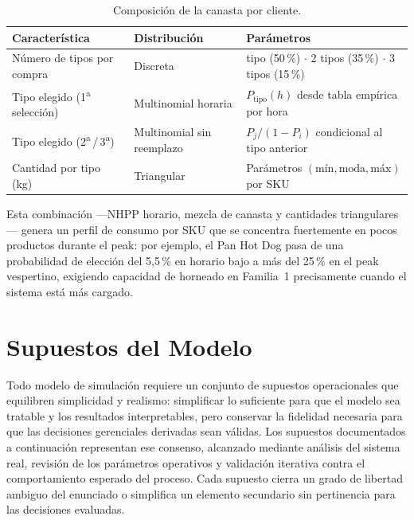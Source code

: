 \documentclass[10pt, a4paper]{article}
\begin{document}
\begin{table}[H]
\centering
\caption{Composici\'on de la canasta por cliente.}
\label{tab:canasta_cli}
\renewcommand{\arraystretch}{1.30}
\begin{tabularx}{\textwidth}{>{\raggedright\arraybackslash}p{4.0cm}
                              >{\raggedright\arraybackslash}p{3.4cm}
                              >{\raggedright\arraybackslash}X}
\toprule
\rowcolor{azulClaro}
\textbf{Caracter\'istica} & \textbf{Distribuci\'on} & \textbf{Par\'ametros} \\
\midrule
N\'umero de tipos por compra
  & Discreta
  & 1 tipo (50\,\%) $\cdot$ 2 tipos (35\,\%) $\cdot$ 3 tipos (15\,\%) \\
\rowcolor{grisClaro}
Tipo elegido (1\textsuperscript{a} selecci\'on)
  & Multinomial horaria
  & $P_{\text{tipo}}(h)$ desde tabla emp\'irica por hora \\
Tipo elegido (2\textsuperscript{a}\,/\,3\textsuperscript{a})
  & Multinomial sin reemplazo
  & $P_j / (1-P_i)$ condicional al tipo anterior \\
\rowcolor{grisClaro}
Cantidad por tipo (kg)
  & Triangular
  & Par\'ametros $(\text{m\'in},\text{moda},\text{m\'ax})$ por SKU \\
\bottomrule
\end{tabularx}
\end{table}

Esta combinaci\'on ---NHPP horario, mezcla de canasta y cantidades
triangulares--- genera un perfil de consumo por SKU que se concentra
fuertemente en pocos productos durante el peak: por ejemplo, el Pan Hot Dog pasa
de una probabilidad de elecci\'on del 5{,}5\,\% en horario bajo a m\'as del
25\,\% en el peak vespertino, exigiendo capacidad de horneado en Familia~1
precisamente cuando el sistema est\'a m\'as cargado.

\newpage

\section{Supuestos del Modelo}
\label{sec:supuestos}

Todo modelo de simulaci\'on requiere un conjunto de supuestos operacionales
que equilibren simplicidad y realismo: simplificar lo suficiente para que el
modelo sea tratable y los resultados interpretables, pero conservar la
fidelidad necesaria para que las decisiones gerenciales derivadas sean
v\'alidas. Los supuestos documentados a continuaci\'on representan ese
consenso, alcanzado mediante an\'alisis del sistema real, revisi\'on de los
par\'ametros operativos y validaci\'on iterativa contra el comportamiento
esperado del proceso. Cada supuesto cierra un grado de libertad ambiguo del
enunciado o simplifica un elemento secundario sin pertinencia para las
decisiones evaluadas.
\end{document}
